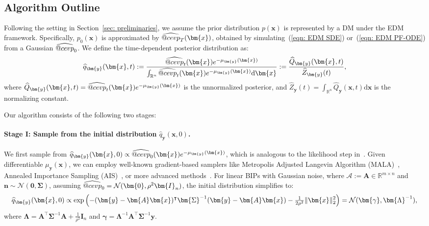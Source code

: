 \documentclass{article}
\makeatletter
\numberwithin{equation}{section}
\def\eqref#1{(\ref{#1})}
\newcommand{\dif}{{\mathrm{d}}}
\def\vzero{{\bm{0}}}
\def\vn{{\bm{n}}}
\def\vx{{\bm{x}}}
\def\vy{{\bm{y}}}
\def\vgamma{{\bm{\gamma}}}
\def\mA{{\bm{A}}}
\def\mI{{\bm{I}}}
\def\mLambda{{\bm{\Lambda}}}
\def\mSigma{{\bm{\Sigma}}}
\def\gA{{\mathcal{A}}}
\def\gN{{\mathcal{N}}}
\DeclareRobustCommand{\cev}[1]{%
  {\mathpalette\do@cev{#1}}%
}
\newcommand{\do@cev}[2]{%
  \vbox{\offinterlineskip
    \sbox\z@{$\m@th#1 x$}%
    \ialign{##\cr
      \hidewidth\reflectbox{$\m@th#1\vec{}\mkern4mu$}\hidewidth\cr
      \noalign{\kern-\ht\z@}
      $\m@th#1#2$\cr
    }%
  }%
}
\makeatother
\begin{document}
\subsection{Algorithm Outline}
\label{subsec: algo outline}

Following the setting in Section~\ref{sec: preliminaries}, we assume the prior distribution $p(\vx)$ is represented by a DM under the EDM framework. Specifically, $p_0(\vx)$ is approximated by $\widehat{\cev{p}}_T(\vx)$, obtained by simulating~\eqref{eqn: EDM SDE} or~\eqref{eqn: EDM PF-ODE} from a Gaussian $\widehat{\cev{p}}_0$. We define the time-dependent posterior distribution as:
\begin{equation}
    \setlength{\abovedisplayskip}{3pt}
    \setlength{\belowdisplayskip}{3pt}
    \label{eqn: defn of time-dependent posterior}
    \widehat{q}_{\vy}(\vx,t) := \frac{\widehat{\cev{p}}_t(\vx)e^{-\mu_{\vy}(\vx)}}{\int_{\mathbb{R}^n}\widehat{\cev{p}}_t(\vx)e^{-\mu_{\vy}(\vx)}\dif\vx} := \frac{\widehat{Q}_{\vy}(\vx,t)}{\widehat{Z}_{\vy}(t)},
\end{equation} 
where $\widehat{Q}_{\vy}(\vx,t)= \widehat{\cev{p}}_t(\vx)e^{-\mu_{\vy}(\vx)}$ is the unnormalized posterior, and $\widehat{Z}_{\vy}(t) = \int_{\mathbb{R}^n}\widehat{Q}_{\vy}(\vx,t)\dif\vx$ is the normalizing constant. 

Our algorithm consists of the following two stages:

\paragraph{Stage I: Sample from the initial distribution $\widehat{q}_{\vy}(\vx,0)$.}

We first sample from $\widehat{q}_{\vy}(\vx,0) \propto \widehat{\cev{p}}_0(\vx)e^{-\mu_{\vy}(\vx)}$, which is analogous to the likelihood step in~\cite{wu2024principled}. Given differentiable $\mu_{\vy}(\vx)$, we can employ well-known gradient-based samplers like Metropolis Adjusted Langevin Algorithm (MALA)~\cite{roberts2002langevin}, Annealed 
Importance Sampling (AIS)~\cite{neal2001annealed}, or more advanced methods~\cite{lu2019accelerating,tan2023accelerate,chen2024ensemble,lindsey2022ensemble}. For linear BIPs with Gaussian noise, where $\gA:= \mA \in \mathbb{R}^{m \times n}$ and $\vn \sim \gN(\boldsymbol{0},\mSigma)$, assuming $\widehat{\cev{p}}_0 = \gN(\vzero, \rho^2\mI_n)$, the initial distribution simplifies to:
\begin{equation*}
    \setlength{\abovedisplayskip}{3pt}
    \setlength{\belowdisplayskip}{3pt}
    \widehat{q}_{\vy}(\vx,0) \propto \exp\left(-(\vy - \mA\vx)^\intercal\mSigma^{-1}(\vy -\mA\vx)-\tfrac{1}{2\rho^2}\|\vx\|_2^2\right) = \gN(\vgamma, \mLambda^{-1}),   
\end{equation*}
where $\mLambda = \mA^\intercal\mSigma^{-1}\mA+\frac{1}{\rho^2}\mI_n$ and $\vgamma = \mLambda^{-1}\mA^\intercal\mSigma^{-1}\vy$. 
\end{document}
